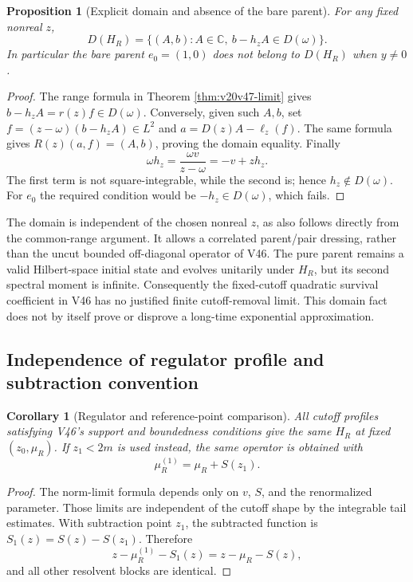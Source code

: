 \documentclass[11pt]{article}
\newtheorem{proposition}[theorem]{Proposition}
\newtheorem{corollary}[theorem]{Corollary}
\theoremstyle{remark}
\begin{document}
\begin{proposition}[Explicit domain and absence of the bare parent]
\label{prop:v20v47-domain}
For any fixed nonreal \(z\),
\[
 D(H_R)=\{(A,b): A\in\mathbb C,\ b-h_zA\in D(\omega)\}.
\]
In particular the bare parent \(e_0=(1,0)\) does not belong to
\(D(H_R)\) when \(y\neq0\).
\end{proposition}
\begin{proof}
The range formula in Theorem \ref{thm:v20v47-limit} gives
\(b-h_zA=r(z)f\in D(\omega)\).
Conversely, given such \(A,b\), set
\(f=(z-\omega)(b-h_zA)\in L^2\) and
\(a=D(z)A-\ell_z(f)\).  The same formula gives
\(R(z)(a,f)=(A,b)\), proving the domain equality.
Finally
\[
 \omega h_z=\frac{\omega v}{z-\omega}=-v+z h_z.
\]
The first term is not square-integrable, while the second is;
hence \(h_z\notin D(\omega)\).  For \(e_0\) the required
condition would be \(-h_z\in D(\omega)\), which fails.
\end{proof}

The domain is independent of the chosen nonreal \(z\), as also follows
directly from the common-range argument.  It allows a correlated
parent/pair dressing, rather than the uncut bounded off-diagonal
operator of V46.  The pure parent remains a valid Hilbert-space
initial state and evolves unitarily under \(H_R\), but its second
spectral moment is infinite.  Consequently the fixed-cutoff
quadratic survival coefficient in V46 has no justified finite
cutoff-removal limit.  This domain fact does not by itself prove
or disprove a long-time exponential approximation.

\subsection{Independence of regulator profile and subtraction convention}

\begin{corollary}[Regulator and reference-point comparison]
\label{cor:v20v47-reference}
All cutoff profiles satisfying V46's support and boundedness
conditions give the same \(H_R\) at fixed \((z_0,\mu_R)\).
If \(z_1<2m\) is used instead, the same operator is obtained with
\[
 \mu_R^{(1)}=\mu_R+S(z_1).
\]
\end{corollary}
\begin{proof}
The norm-limit formula depends only on \(v\), \(S\), and the
renormalized parameter.  Those limits are independent of the
cutoff shape by the integrable tail estimates.
With subtraction point \(z_1\), the subtracted function is
\(S_1(z)=S(z)-S(z_1)\).  Therefore
\[
 z-\mu_R^{(1)}-S_1(z)=z-\mu_R-S(z),
\]
and all other resolvent blocks are identical.
\end{proof}
\end{document}
